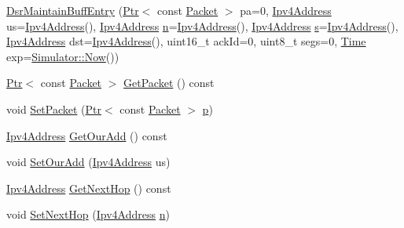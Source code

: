\begin{DoxyCompactItemize}
\item 
\hyperlink{classns3_1_1dsr_1_1DsrMaintainBuffEntry_a5ce479858c764170e880430be79473fa}{Dsr\+Maintain\+Buff\+Entry} (\hyperlink{classns3_1_1Ptr}{Ptr}$<$ const \hyperlink{classns3_1_1Packet}{Packet} $>$ pa=0, \hyperlink{classns3_1_1Ipv4Address}{Ipv4\+Address} us=\hyperlink{classns3_1_1Ipv4Address}{Ipv4\+Address}(), \hyperlink{classns3_1_1Ipv4Address}{Ipv4\+Address} \hyperlink{lte__link__budget__x2__handover__measures_8m_abdb05bc5a064cf642a06c83b3392f148}{n}=\hyperlink{classns3_1_1Ipv4Address}{Ipv4\+Address}(), \hyperlink{classns3_1_1Ipv4Address}{Ipv4\+Address} \hyperlink{generate__test__data__lte__sinr_8m_ad83eeb3a142285d1243a08c6b7026df8}{s}=\hyperlink{classns3_1_1Ipv4Address}{Ipv4\+Address}(), \hyperlink{classns3_1_1Ipv4Address}{Ipv4\+Address} dst=\hyperlink{classns3_1_1Ipv4Address}{Ipv4\+Address}(), uint16\+\_\+t ack\+Id=0, uint8\+\_\+t segs=0, \hyperlink{classns3_1_1Time}{Time} exp=\hyperlink{classns3_1_1Simulator_ac3178fa975b419f7875e7105be122800}{Simulator\+::\+Now}())
\item 
\hyperlink{classns3_1_1Ptr}{Ptr}$<$ const \hyperlink{classns3_1_1Packet}{Packet} $>$ \hyperlink{classns3_1_1dsr_1_1DsrMaintainBuffEntry_a3e47d107d9907f8bdf287c0d9915e3ba}{Get\+Packet} () const 
\item 
void \hyperlink{classns3_1_1dsr_1_1DsrMaintainBuffEntry_a2f8880c2042a4428804ee7fa0dfc4f21}{Set\+Packet} (\hyperlink{classns3_1_1Ptr}{Ptr}$<$ const \hyperlink{classns3_1_1Packet}{Packet} $>$ \hyperlink{lte__link__budget__x2__handover__measures_8m_ac9de518908a968428863f829398a4e62}{p})
\item 
\hyperlink{classns3_1_1Ipv4Address}{Ipv4\+Address} \hyperlink{classns3_1_1dsr_1_1DsrMaintainBuffEntry_ac5e99d05ac9b0881ef0470a995f18e8c}{Get\+Our\+Add} () const 
\item 
void \hyperlink{classns3_1_1dsr_1_1DsrMaintainBuffEntry_a6ac88448802d66ee6727af486b09f30f}{Set\+Our\+Add} (\hyperlink{classns3_1_1Ipv4Address}{Ipv4\+Address} us)
\item 
\hyperlink{classns3_1_1Ipv4Address}{Ipv4\+Address} \hyperlink{classns3_1_1dsr_1_1DsrMaintainBuffEntry_a6a984d4169f808eb39c29468a03a7d62}{Get\+Next\+Hop} () const 
\item 
void \hyperlink{classns3_1_1dsr_1_1DsrMaintainBuffEntry_a1bdc91bde062bced6a19d5713b03f055}{Set\+Next\+Hop} (\hyperlink{classns3_1_1Ipv4Address}{Ipv4\+Address} \hyperlink{lte__link__budget__x2__handover__measures_8m_abdb05bc5a064cf642a06c83b3392f148}{n})

\end{DoxyCompactItemize}
